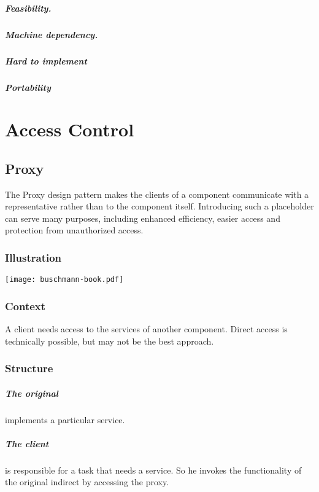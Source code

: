\documentclass[a4paper,11pt,twocolumn]{report}
\begin{document}
    \paragraph{Feasibility.}
    \paragraph{Machine dependency.}
    \paragraph{Hard to implement}
    \paragraph{Portability}
    
    
    \chapter{Access Control}

    \section{Proxy}
    The Proxy design pattern makes the clients of a component communicate with
    a representative rather than to the component itself. Introducing such a
    placeholder can serve many purposes, including enhanced efficiency, easier
    access and protection from unauthorized access.
    \subsection{Illustration}
    \texttt{[image: buschmann-book.pdf]}
    \subsection{Context}
    A client needs access to the services of another component. Direct access
    is technically possible, but may not be the best approach.
    \subsection{Structure}
    \paragraph{The original} implements a particular service.
    \paragraph{The client} is responsible for a task that needs a service. So 
    he invokes the functionality of the original indirect by accessing the 
    proxy. 
\end{document}
